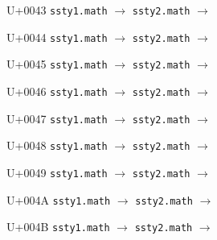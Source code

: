 \documentclass{article}
\begin{document}
\begin{substitutions}
\goodbreak

U+0043  \linebreak
    \texttt{ssty1.math} $\to$  \linebreak
    \texttt{ssty2.math} $\to$  

\goodbreak

U+0044  \linebreak
    \texttt{ssty1.math} $\to$  \linebreak
    \texttt{ssty2.math} $\to$  

\goodbreak

U+0045  \linebreak
    \texttt{ssty1.math} $\to$  \linebreak
    \texttt{ssty2.math} $\to$  

\goodbreak

U+0046  \linebreak
    \texttt{ssty1.math} $\to$  \linebreak
    \texttt{ssty2.math} $\to$  

\goodbreak

U+0047  \linebreak
    \texttt{ssty1.math} $\to$  \linebreak
    \texttt{ssty2.math} $\to$  

\goodbreak

U+0048  \linebreak
    \texttt{ssty1.math} $\to$  \linebreak
    \texttt{ssty2.math} $\to$  

\goodbreak

U+0049  \linebreak
    \texttt{ssty1.math} $\to$  \linebreak
    \texttt{ssty2.math} $\to$  

\goodbreak

U+004A  \linebreak
    \texttt{ssty1.math} $\to$  \linebreak
    \texttt{ssty2.math} $\to$  

\goodbreak

U+004B  \linebreak
    \texttt{ssty1.math} $\to$  \linebreak
    \texttt{ssty2.math} $\to$  


\end{substitutions}
\end{document}
